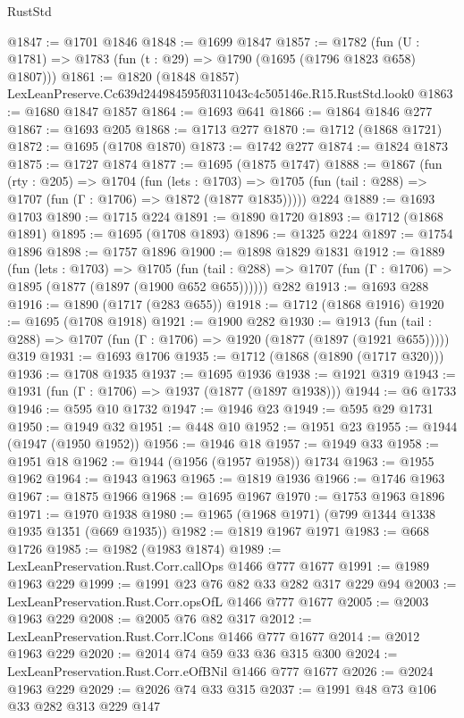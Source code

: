 \begin{lexlean}{RustStd}
\begin{coremodule}
@1847 := @1701 @1846
@1848 := @1699 @1847
@1857 := @1782 (fun (U : @1781) => @1783 (fun (t : @29) => @1790 (@1695 (@1796 @1823 @658) @1807)))
@1861 := @1820 (@1848 @1857) LexLeanPreserve.Cc639d244984595f0311043c4c505146e.R15.RustStd.look0
@1863 := @1680 @1847 @1857
@1864 := @1693 @641
@1866 := @1864 @1846 @277
@1867 := @1693 @205
@1868 := @1713 @277
@1870 := @1712 (@1868 @1721)
@1872 := @1695 (@1708 @1870)
@1873 := @1742 @277
@1874 := @1824 @1873
@1875 := @1727 @1874
@1877 := @1695 (@1875 @1747)
@1888 := @1867
    (fun (rty : @205) =>
    @1704
      (fun (lets : @1703) =>
      @1705 (fun (tail : @288) => @1707 (fun (Γ : @1706) => @1872 (@1877 @1835)))))
    @224
@1889 := @1693 @1703
@1890 := @1715 @224
@1891 := @1890 @1720
@1893 := @1712 (@1868 @1891)
@1895 := @1695 (@1708 @1893)
@1896 := @1325 @224
@1897 := @1754 @1896
@1898 := @1757 @1896
@1900 := @1898 @1829 @1831
@1912 := @1889
    (fun (lets : @1703) =>
    @1705 (fun (tail : @288) => @1707 (fun (Γ : @1706) => @1895 (@1877 (@1897 (@1900 @652 @655))))))
    @282
@1913 := @1693 @288
@1916 := @1890 (@1717 (@283 @655))
@1918 := @1712 (@1868 @1916)
@1920 := @1695 (@1708 @1918)
@1921 := @1900 @282
@1930 := @1913
    (fun (tail : @288) => @1707 (fun (Γ : @1706) => @1920 (@1877 (@1897 (@1921 @655)))))
    @319
@1931 := @1693 @1706
@1935 := @1712 (@1868 (@1890 (@1717 @320)))
@1936 := @1708 @1935
@1937 := @1695 @1936
@1938 := @1921 @319
@1943 := @1931 (fun (Γ : @1706) => @1937 (@1877 (@1897 @1938)))
@1944 := @6 @1733
@1946 := @595 @10 @1732
@1947 := @1946 @23
@1949 := @595 @29 @1731
@1950 := @1949 @32
@1951 := @448 @10
@1952 := @1951 @23
@1955 := @1944 (@1947 (@1950 @1952))
@1956 := @1946 @18
@1957 := @1949 @33
@1958 := @1951 @18
@1962 := @1944 (@1956 (@1957 @1958)) @1734
@1963 := @1955 @1962
@1964 := @1943 @1963
@1965 := @1819 @1936
@1966 := @1746 @1963
@1967 := @1875 @1966
@1968 := @1695 @1967
@1970 := @1753 @1963 @1896
@1971 := @1970 @1938
@1980 := @1965 (@1968 @1971) (@799 @1344 @1338 @1935 @1351 (@669 @1935))
@1982 := @1819 @1967 @1971
@1983 := @668 @1726
@1985 := @1982 (@1983 @1874)
@1989 := LexLeanPreservation.Rust.Corr.callOps @1466 @777 @1677
@1991 := @1989 @1963 @229
@1999 := @1991 @23 @76 @82 @33 @282 @317 @229 @94
@2003 := LexLeanPreservation.Rust.Corr.opsOfL @1466 @777 @1677
@2005 := @2003 @1963 @229
@2008 := @2005 @76 @82 @317
@2012 := LexLeanPreservation.Rust.Corr.lCons @1466 @777 @1677
@2014 := @2012 @1963 @229
@2020 := @2014 @74 @59 @33 @36 @315 @300
@2024 := LexLeanPreservation.Rust.Corr.eOfBNil @1466 @777 @1677
@2026 := @2024 @1963 @229
@2029 := @2026 @74 @33 @315
@2037 := @1991 @48 @73 @106 @33 @282 @313 @229 @147

\end{coremodule}
\end{lexlean}
